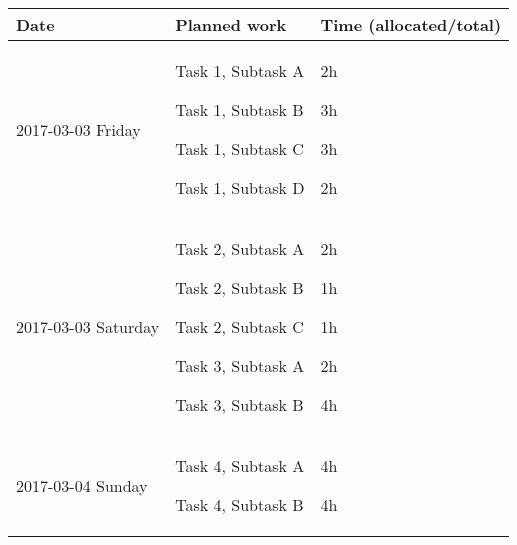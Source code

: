 \begin{longtable}[c]{@{}lll@{}}
\toprule
\begin{minipage}[b]{0.28\columnwidth}\raggedright\strut
Date
\strut\end{minipage} &
\begin{minipage}[b]{0.25\columnwidth}\raggedright\strut
Planned work
\strut\end{minipage} &
\begin{minipage}[b]{0.32\columnwidth}\raggedright\strut
Time (allocated/total)
\strut\end{minipage}\tabularnewline
\midrule
\endhead
\begin{minipage}[t]{0.28\columnwidth}\raggedright\strut
2017-03-03 Friday
\strut\end{minipage} &
\begin{minipage}[t]{0.25\columnwidth}\raggedright\strut
Task 1, Subtask A

Task 1, Subtask B

Task 1, Subtask C

Task 1, Subtask D
\strut\end{minipage} &
\begin{minipage}[t]{0.32\columnwidth}\raggedright\strut
2h

3h

3h

2h
\strut\end{minipage}\tabularnewline
\begin{minipage}[t]{0.28\columnwidth}\raggedright\strut
2017-03-03 Saturday
\strut\end{minipage} &
\begin{minipage}[t]{0.25\columnwidth}\raggedright\strut
Task 2, Subtask A

Task 2, Subtask B

Task 2, Subtask C

Task 3, Subtask A

Task 3, Subtask B
\strut\end{minipage} &
\begin{minipage}[t]{0.32\columnwidth}\raggedright\strut
2h

1h

1h

2h

4h
\strut\end{minipage}\tabularnewline
\begin{minipage}[t]{0.28\columnwidth}\raggedright\strut
2017-03-04 Sunday
\strut\end{minipage} &
\begin{minipage}[t]{0.25\columnwidth}\raggedright\strut
Task 4, Subtask A

Task 4, Subtask B
\strut\end{minipage} &
\begin{minipage}[t]{0.32\columnwidth}\raggedright\strut
4h

4h
\strut\end{minipage}\tabularnewline
\bottomrule
\end{longtable}
